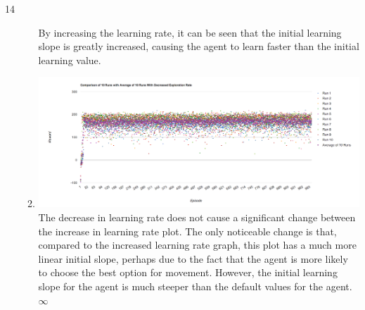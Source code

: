 14\documentclass[12pt]{article}%
\begin{document}
\begin{enumerate}[a)]
\begin{enumerate}[i]
                By increasing the learning rate, it can be seen that the initial learning slope is greatly increased, causing the agent to learn faster than the initial learning value.
                \item \includegraphics[scale=.25]{decrased_exp} \\
                The decrease in learning rate does not cause a significant change between the increase in learning rate plot. The only noticeable change is that, compared to the increased learning rate graph, this plot has a much more linear initial slope, perhaps due to the fact that the agent is more likely to choose the best option for movement. However, the initial learning slope for the agent is much steeper than the default values for the agent. 
                $\infty$
            \end{enumerate}
    \end{enumerate}
\end{document}
